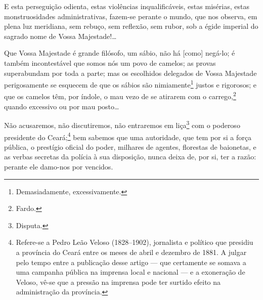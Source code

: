 {E esta perseguição odienta, estas violências inqualificáveis, estas
misérias, estas monstruosidades administrativas, fazem-se perante o
mundo, que nos observa, em plena luz meridiana, sem rebuço, sem
reflexão, sem rubor, sob a égide imperial do sagrado nome de Vossa
Majestade!\ldots{}

Que Vossa Majestade é grande filósofo, um sábio, não há {[}como{]} %
negá-lo; é também incontestável que somos nós um povo de
camelos; as provas superabundam por toda a parte; mas os escolhidos
delegados de Vossa Majestade perigosamente se esquecem de que os sábios
são nimiamente\footnote{Demasiadamente, excessivamente.} justos e
rigorosos; e que os camelos têm, por índole, o mau vezo de se
atirarem com o carrego,\footnote{Fardo.} quando excessivo ou por mau
posto\ldots{}

Não acusaremos, não discutiremos, não entraremos em liça\footnote{
  Disputa.} com o poderoso presidente do Ceará;\footnote{Refere-se a
  Pedro Leão Veloso (1828--1902), jornalista e político que presidiu a
  província do Ceará entre os meses de abril e dezembro de 1881. A
  julgar pelo tempo entre a publicação desse artigo --- que certamente se
  somava a uma campanha pública na imprensa local e nacional --- e a
  exoneração de Veloso, vê-se que a pressão na imprensa pode ter surtido
  efeito na administração da província.} bem sabemos que uma autoridade,
que tem por si a força pública, o prestígio oficial do poder, milhares
de agentes, florestas de baionetas, e as verbas secretas da polícia à
sua disposição, nunca deixa de, por si, ter a razão: perante ele
damo-nos por vencidos.

}

